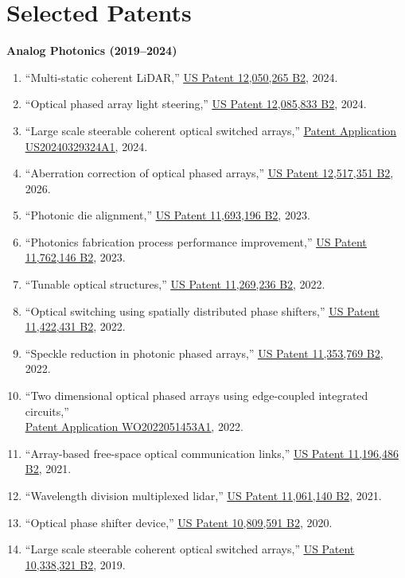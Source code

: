 \section{Selected Patents}
\vspace{0.2cm}

\noindent\textbf{Analog Photonics (2019--2024)}
\begin{enumerate}
    \item ``Multi-static coherent LiDAR,'' \href{https://patents.google.com/patent/US12050265B2}{\underline{US Patent 12,050,265 B2}}, 2024.
    \item ``Optical phased array light steering,'' \href{https://patents.google.com/patent/US12085833B2}{\underline{US Patent 12,085,833 B2}}, 2024.
    \item ``Large scale steerable coherent optical switched arrays,'' \href{https://patents.google.com/patent/US20240329324A1}{\underline{Patent Application US20240329324A1}}, 2024.
    \item ``Aberration correction of optical phased arrays,'' \href{https://patents.google.com/patent/US12517351B2}{\underline{US Patent 12,517,351 B2}}, 2026.
    \item ``Photonic die alignment,'' \href{https://patents.google.com/patent/US11693196B2}{\underline{US Patent 11,693,196 B2}}, 2023.
    \item ``Photonics fabrication process performance improvement,'' \href{https://patents.google.com/patent/US11762146B2}{\underline{US Patent 11,762,146 B2}}, 2023.
    \item ``Tunable optical structures,'' \href{https://patents.google.com/patent/US11269236B2}{\underline{US Patent 11,269,236 B2}}, 2022.
    \item ``Optical switching using spatially distributed phase shifters,'' \href{https://patents.google.com/patent/US11422431B2}{\underline{US Patent 11,422,431 B2}}, 2022.
    \item ``Speckle reduction in photonic phased arrays,'' \href{https://patents.google.com/patent/US11353769B2}{\underline{US Patent 11,353,769 B2}}, 2022.
    \item ``Two dimensional optical phased arrays using edge-coupled integrated circuits,'' \\
    \href{https://patents.google.com/patent/WO2022051453A1}{\underline{Patent Application WO2022051453A1}}, 2022.
    \item ``Array-based free-space optical communication links,'' \href{https://patents.google.com/patent/US11196486B2}{\underline{US Patent 11,196,486 B2}}, 2021.
    \item ``Wavelength division multiplexed lidar,'' \href{https://patents.google.com/patent/US11061140B2}{\underline{US Patent 11,061,140 B2}}, 2021.
    \item ``Optical phase shifter device,'' \href{https://patents.google.com/patent/US10809591B2}{\underline{US Patent 10,809,591 B2}}, 2020.
    \item ``Large scale steerable coherent optical switched arrays,'' \href{https://patents.google.com/patent/US10338321B2}{\underline{US Patent 10,338,321 B2}}, 2019.
\end{enumerate}

